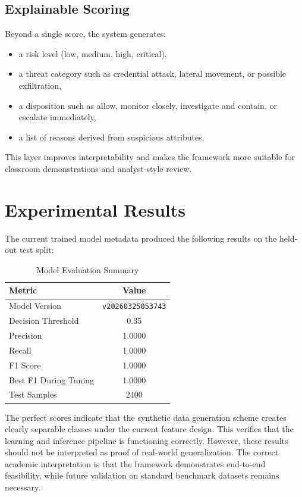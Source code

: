 \documentclass[conference]{IEEEtran}
\begin{document}
\subsection{Explainable Scoring}
Beyond a single score, the system generates:
\begin{itemize}
\item a risk level (low, medium, high, critical),
\item a threat category such as credential attack, lateral movement, or possible exfiltration,
\item a disposition such as allow, monitor closely, investigate and contain, or escalate immediately,
\item a list of reasons derived from suspicious attributes.
\end{itemize}

This layer improves interpretability and makes the framework more suitable for classroom demonstrations and analyst-style review.

\section{Experimental Results}
The current trained model metadata produced the following results on the held-out test split:

\begin{table}[!t]
\caption{Model Evaluation Summary}
\centering
\begin{tabular}{lc}
\toprule
\textbf{Metric} & \textbf{Value} \\
\midrule
Model Version & \texttt{v20260325053743} \\
Decision Threshold & 0.35 \\
Precision & 1.0000 \\
Recall & 1.0000 \\
F1 Score & 1.0000 \\
Best F1 During Tuning & 1.0000 \\
Test Samples & 2400 \\
\bottomrule
\end{tabular}
\end{table}

The perfect scores indicate that the synthetic data generation scheme creates clearly separable classes under the current feature design. This verifies that the learning and inference pipeline is functioning correctly. However, these results should not be interpreted as proof of real-world generalization. The correct academic interpretation is that the framework demonstrates end-to-end feasibility, while future validation on standard benchmark datasets remains necessary.
\end{document}
